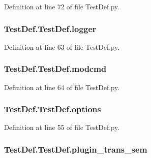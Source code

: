 Definition at line 72 of file Test\-Def.\-py.

\hypertarget{classTestDef_1_1TestDef_a2ec3a5ec20bb6ba539d68c3c5a40ca5d}{
\subsubsection[{logger}]{\setlength{\rightskip}{0pt plus 5cm}Test\-Def.\-Test\-Def.\-logger}}\label{classTestDef_1_1TestDef_a2ec3a5ec20bb6ba539d68c3c5a40ca5d}


Definition at line 63 of file Test\-Def.\-py.

\hypertarget{classTestDef_1_1TestDef_af6c1e9ceaf9d8e747bbb57af3bd33198}{
\subsubsection[{modcmd}]{\setlength{\rightskip}{0pt plus 5cm}Test\-Def.\-Test\-Def.\-modcmd}}\label{classTestDef_1_1TestDef_af6c1e9ceaf9d8e747bbb57af3bd33198}


Definition at line 64 of file Test\-Def.\-py.

\hypertarget{classTestDef_1_1TestDef_a7c7d587995154a9f31607dc4726d3a2a}{
\subsubsection[{options}]{\setlength{\rightskip}{0pt plus 5cm}Test\-Def.\-Test\-Def.\-options}}\label{classTestDef_1_1TestDef_a7c7d587995154a9f31607dc4726d3a2a}


Definition at line 55 of file Test\-Def.\-py.

\hypertarget{classTestDef_1_1TestDef_ac4a745e8b2151d1eed56e04770562eb9}{
\subsubsection[{plugin\-\_\-trans\-\_\-sem}]{\setlength{\rightskip}{0pt plus 5cm}Test\-Def.\-Test\-Def.\-plugin\-\_\-trans\-\_\-sem}}\label{classTestDef_1_1TestDef_ac4a745e8b2151d1eed56e04770562eb9}



